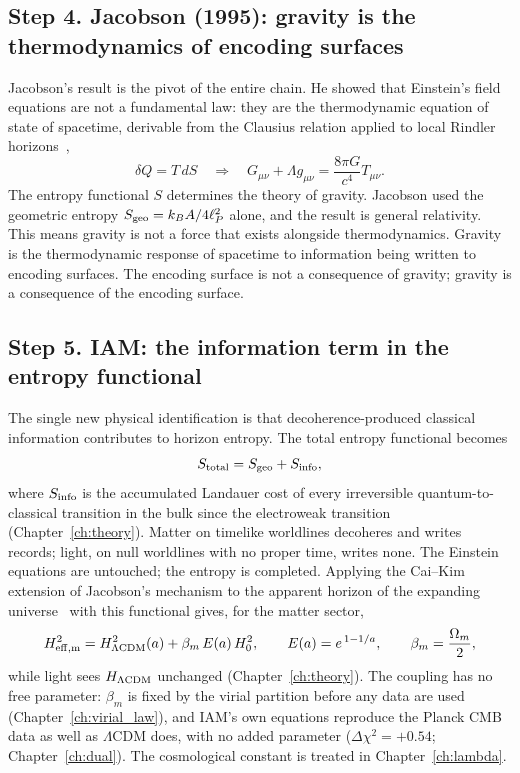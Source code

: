 \subsection*{Step 4. Jacobson (1995): gravity is the thermodynamics of encoding surfaces}
Jacobson's result is the pivot of the entire chain. He showed that Einstein's field equations are not a fundamental law: they are the
thermodynamic equation of state of spacetime, derivable from the Clausius relation applied to local Rindler horizons~\cite{Jacobson1995},
\begin{equation}
  \delta Q=T\,dS\quad\Longrightarrow\quad G_{\mu\nu}+\Lambda g_{\mu\nu}=\frac{8\pi G}{c^4}T_{\mu\nu}.
\end{equation}
\derived{} The entropy functional $S$ determines the theory of gravity. Jacobson used the geometric entropy $S_{\rm geo}=k_BA/4\ell_P^2$ alone, and the
result is general relativity. This means gravity is not a force that exists alongside thermodynamics. Gravity is the thermodynamic response of
spacetime to information being written to encoding surfaces. The encoding surface is not a consequence of gravity; gravity is a consequence of the
encoding surface. \interp

\subsection*{Step 5. IAM: the information term in the entropy functional}
The single new physical identification is that decoherence-produced classical information contributes to horizon entropy. The total entropy
functional becomes
\begin{equation}
  S_{\rm total}=S_{\rm geo}+S_{\rm info},
\end{equation}
where $S_{\rm info}$ is the accumulated Landauer cost of every irreversible quantum-to-classical transition in the bulk since the electroweak
transition (Chapter~\ref{ch:theory}). \conjecture{} Matter on timelike worldlines decoheres and writes records; light, on null worldlines with no
proper time, writes none. The Einstein equations are untouched; the entropy is completed. Applying the Cai--Kim extension of Jacobson's mechanism to the
apparent horizon of the expanding universe~\cite{CaiKim2005} with this functional gives, for the matter sector,
\begin{equation}
  H^2_{\rm eff,m}=H^2_{\Lambda{\rm CDM}}(a)+\beta_m\,E(a)\,H_0^2,\qquad E(a)=e^{\,1-1/a},\qquad \beta_m=\frac{\Omega_m}{2},
\end{equation}
while light sees $H_{\Lambda{\rm CDM}}$ unchanged (Chapter~\ref{ch:theory}). \derived{} The coupling has no free parameter: $\beta_m$ is fixed by the virial
partition before any data are used (Chapter~\ref{ch:virial_law}), and IAM's own equations reproduce the Planck CMB data as well as $\Lambda$CDM does, with no added parameter
($\Delta\chi^2=+0.54$; Chapter~\ref{ch:dual}). \measured{} The cosmological constant is treated in Chapter~\ref{ch:lambda}.

